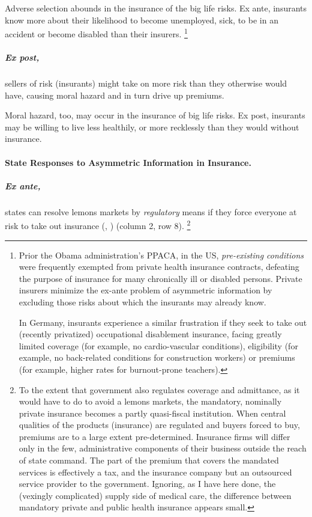 Adverse selection abounds in the insurance of the big life risks.
Ex ante, insurants know more about their likelihood to become unemployed, sick, to be in an accident or become disabled than their insurers.
\footnote{
	Prior the Obama administration's \gls{PPACA}, in the US, \emph{pre-existing conditions} were frequently exempted from private health insurance contracts, defeating the purpose of insurance for many chronically ill or disabled persons.
	Private insurers minimize the ex-ante problem of asymmetric information by excluding those risks about which the insurants may already know.

	In Germany, insurants experience a similar frustration if they seek to take out (recently privatized) occupational disablement insurance, facing greatly limited coverage (for example, no cardio-vascular conditions), eligibility (for example, no back-related conditions for construction workers) or premiums (for example, higher rates for burnout-prone teachers).
}

\subparagraph[Moral Hazard]{Ex post,}
	\label{sec:moral-hazard}
sellers of risk (insurants) might take on more risk than they otherwise would have, causing moral hazard and in turn drive up premiums.

Moral hazard, too, may occur in the insurance of big life risks.
Ex post, insurants may be willing to live less healthily, or more recklessly than they would without insurance.

\paragraph{State Responses to Asymmetric Information in Insurance.}
	\label{sec:state-insurance}

\subparagraph{Ex ante,}
states can resolve lemons markets by \emph{regulatory} means if they force everyone at risk to take out insurance (\citealt{Akerlof-1970-aa}, \citealt{Barr})
(column 2, row 8).
\footnote{
	To the extent that government also regulates coverage and admittance, as it would have to do to avoid a lemons markets, the mandatory, nominally private insurance becomes a partly quasi-fiscal institution.
	When central qualities of the products (insurance) are regulated and buyers forced to buy, premiums are to a large extent pre-determined.
	Insurance firms will differ only in the few, administrative components of their business outside the reach of state command.
	The part of the premium that covers the mandated services is effectively a tax, and the insurance company but an outsourced service provider to the government.
	Ignoring, as I have here done, the (vexingly complicated) supply side of medical care, the difference between mandatory private and public health insurance appears small.
}

